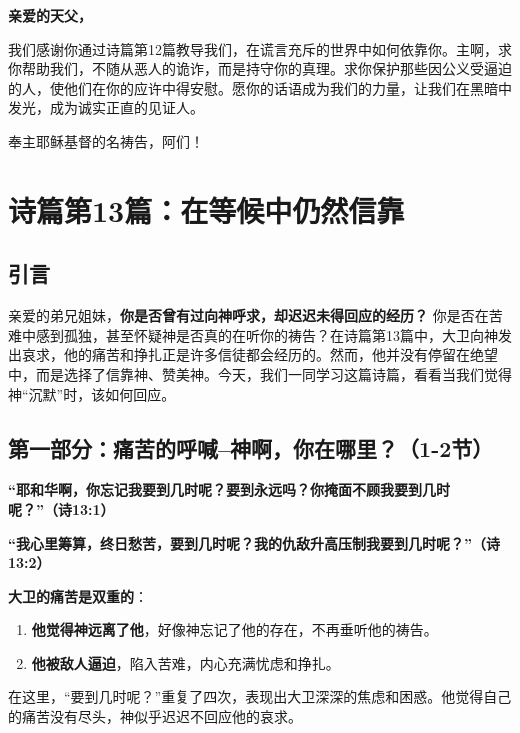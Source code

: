\documentclass[a4paper, 12pt]{article}
\begin{document}
\textbf{亲爱的天父，}

我们感谢你通过诗篇第12篇教导我们，在谎言充斥的世界中如何依靠你。主啊，求你帮助我们，不随从恶人的诡诈，而是持守你的真理。求你保护那些因公义受逼迫的人，使他们在你的应许中得安慰。愿你的话语成为我们的力量，让我们在黑暗中发光，成为诚实正直的见证人。

奉主耶稣基督的名祷告，阿们！

\newpage

\section{诗篇第13篇：在等候中仍然信靠}  

\subsection*{引言}
亲爱的弟兄姐妹，\textbf{你是否曾有过向神呼求，却迟迟未得回应的经历？} 你是否在苦难中感到孤独，甚至怀疑神是否真的在听你的祷告？在诗篇第13篇中，大卫向神发出哀求，他的痛苦和挣扎正是许多信徒都会经历的。然而，他并没有停留在绝望中，而是选择了信靠神、赞美神。今天，我们一同学习这篇诗篇，看看当我们觉得神“沉默”时，该如何回应。  



\subsection*{第一部分：痛苦的呼喊--神啊，你在哪里？（1-2节）}
\hspace{0.4cm}\textbf{“耶和华啊，你忘记我要到几时呢？要到永远吗？你掩面不顾我要到几时呢？”（诗13:1）} 

\textbf{“我心里筹算，终日愁苦，要到几时呢？我的仇敌升高压制我要到几时呢？”（诗13:2）  }

\vspace{0.2cm}

\textbf{大卫的痛苦是双重的}：

\begin{enumerate}
    \item \textbf{他觉得神远离了他}，好像神忘记了他的存在，不再垂听他的祷告。  
    \item \textbf{他被敌人逼迫}，陷入苦难，内心充满忧虑和挣扎。 
\end{enumerate}

在这里，“要到几时呢？”重复了四次，表现出大卫深深的焦虑和困惑。他觉得自己的痛苦没有尽头，神似乎迟迟不回应他的哀求。  
\end{document}
